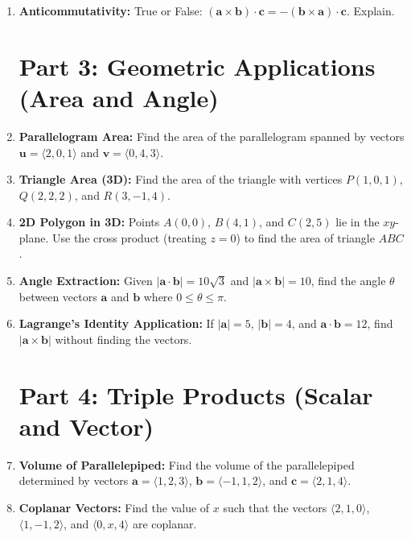 \documentclass[11pt]{article}
\begin{document}
\begin{enumerate}
    \item \textbf{Anticommutativity:} True or False: $(\mathbf{a} \times \mathbf{b}) \cdot \mathbf{c} = - (\mathbf{b} \times \mathbf{a}) \cdot \mathbf{c}$. Explain.

\section*{Part 3: Geometric Applications (Area and Angle)}
    
    \item \textbf{Parallelogram Area:} Find the area of the parallelogram spanned by vectors $\mathbf{u} = \langle 2, 0, 1 \rangle$ and $\mathbf{v} = \langle 0, 4, 3 \rangle$.
    
    \item \textbf{Triangle Area (3D):} Find the area of the triangle with vertices $P(1, 0, 1)$, $Q(2, 2, 2)$, and $R(3, -1, 4)$.
    
    \item \textbf{2D Polygon in 3D:} Points $A(0,0)$, $B(4,1)$, and $C(2,5)$ lie in the $xy$-plane. Use the cross product (treating $z=0$) to find the area of triangle $ABC$.
    
    \item \textbf{Angle Extraction:} Given $|\mathbf{a} \cdot \mathbf{b}| = 10\sqrt{3}$ and $|\mathbf{a} \times \mathbf{b}| = 10$, find the angle $\theta$ between vectors $\mathbf{a}$ and $\mathbf{b}$ where $0 \le \theta \le \pi$.
    
    \item \textbf{Lagrange's Identity Application:} If $|\mathbf{a}| = 5$, $|\mathbf{b}| = 4$, and $\mathbf{a} \cdot \mathbf{b} = 12$, find $|\mathbf{a} \times \mathbf{b}|$ without finding the vectors.

\section*{Part 4: Triple Products (Scalar and Vector)}
    
    \item \textbf{Volume of Parallelepiped:} Find the volume of the parallelepiped determined by vectors $\mathbf{a} = \langle 1, 2, 3 \rangle$, $\mathbf{b} = \langle -1, 1, 2 \rangle$, and $\mathbf{c} = \langle 2, 1, 4 \rangle$.
    
    \item \textbf{Coplanar Vectors:} Find the value of $x$ such that the vectors $\langle 2, 1, 0 \rangle$, $\langle 1, -1, 2 \rangle$, and $\langle 0, x, 4 \rangle$ are coplanar.
    

\end{enumerate}
\end{document}
